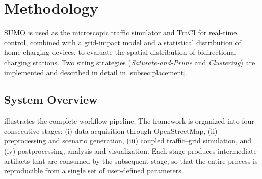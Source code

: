 \section{Methodology}
\label{sec:methodology}




SUMO is used as the microscopic traffic simulator and TraCI for real-time control, combined with a grid-impact model and a statistical distribution of home-charging devices, to evaluate the spatial distribution of bidirectional charging stations. Two siting strategies (\emph{Saturate-and-Prune} and \emph{Clustering}) are implemented and described in detail in \cref{subsec:placement}.

\subsection{System Overview}

 illustrates the complete workflow pipeline. The framework is organized into four consecutive stages: (i) data acquisition through OpenStreetMap, (ii) preprocessing and scenario generation, (iii) coupled traffic--grid simulation, and (iv) postprocessing, analysis and visualization. Each stage produces intermediate artifacts that are consumed by the subsequent stage, so that the entire process is reproducible from a single set of user-defined parameters.

